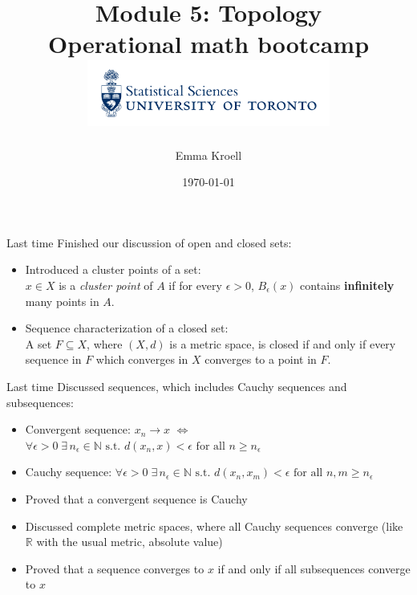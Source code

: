 \documentclass [aspectratio=169]{beamer}
\title[]{Module 5: Topology \\ {\large Operational math bootcamp}\\ \includegraphics[width=8cm]{dept_logo.png}\vspace{-1em}}
\author[]{Emma Kroell}
\institute[]{University of Toronto}
\date{\today}
\newcommand{\R}{{\mathbb{R}}}
\newcommand{\N}{{\mathbb{N}}}
\begin{document}
{
\begin{frame}
    \titlepage
\end{frame}
}

\begin{frame}{Last time}
Finished our discussion of open and closed sets:
\vspace{0.5em}
	\begin{itemize}
	\setlength\itemsep{0.7em}
	\item Introduced a cluster points of a set: \\
	$x \in X$ is a \emph{cluster point} of $A$ if for every $\epsilon >0$, $B_\epsilon(x)$ contains \textbf{infinitely} many points in $A$.
	\item Sequence characterization of a closed set: \\
	A set $F \subseteq X$, where $(X, d)$ is a metric space, is closed if and only if every sequence in $F$ which converges in $X$ converges to a point in $F$.
	\end{itemize}
\end{frame}

\begin{frame}{Last time}
Discussed sequences, which includes Cauchy sequences and subsequences:
\vspace{0.5em}
	\begin{itemize}
	   \setlength\itemsep{0.6em}
	\item Convergent sequence: $x_n \to x$ $\Leftrightarrow$ $\forall \epsilon > 0 \; \exists \, n_\epsilon \in \N \text{ s.t. } d(x_n,x) < \epsilon \text{ for all } n \geq n_\epsilon$
	\item Cauchy sequence:  $ \forall \epsilon>0 \; \exists \, n_\epsilon \in \N \text{ s.t. } d(x_n,x_m) < \epsilon \text{ for all } n,m \geq n_\epsilon$
	\item Proved that a convergent sequence is Cauchy
	\item Discussed complete metric spaces, where all Cauchy sequences converge (like $\R$ with the usual metric, absolute value)
	\item Proved that a sequence converges to $x$ if and only if all subsequences converge to $x$
    \end{itemize}
\end{frame}
\end{document}
